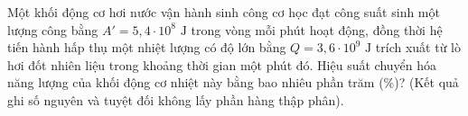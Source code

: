 \begin{ex}	Một khối động cơ hơi nước vận hành sinh công cơ học đạt công suất sinh một lượng công bằng $A' = 5,4 \cdot 10^{8}\text{ J}$ trong vòng mỗi phút hoạt động, đồng thời hệ tiến hành hấp thụ một nhiệt lượng có độ lớn bằng $Q = 3,6 \cdot 10^{9}\text{ J}$ trích xuất từ lò hơi đốt nhiên liệu trong khoảng thời gian một phút đó. Hiệu suất chuyển hóa năng lượng của khối động cơ nhiệt này bằng bao nhiêu phần trăm (\%)? (Kết quả ghi số nguyên và tuyệt đối không lấy phần hàng thập phân).

	\par{}
\end{ex}

